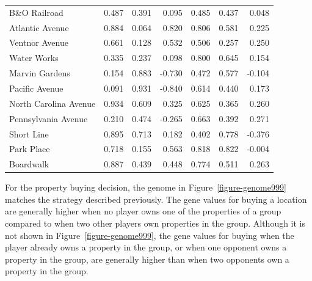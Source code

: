 \begin{table}[htbp]
{\begin{tabular}{lrrr|rrr}
    B\&O Railroad & 0.487  & 0.391  & 0.095  & 0.485  & 0.437  & 0.048 \\
    Atlantic Avenue & 0.884  & 0.064  & 0.820  & 0.806  & 0.581  & 0.225 \\
    Ventnor Avenue & 0.661  & 0.128  & 0.532  & 0.506  & 0.257  & 0.250 \\
    Water Works & 0.335  & 0.237  & 0.098  & 0.800  & 0.645  & 0.154 \\
    Marvin Gardens & 0.154  & 0.883  & -0.730 & 0.472  & 0.577  & -0.104 \\
    \hline 
    Pacific Avenue & 0.091  & 0.931  & -0.840 & 0.614  & 0.440  & 0.173 \\
    North Carolina Avenue & 0.934  & 0.609  & 0.325  & 0.625  & 0.365  & 0.260 \\
    Pennsylvania Avenue & 0.210  & 0.474  & -0.265 & 0.663  & 0.392  & 0.271 \\
    Short Line & 0.895  & 0.713  & 0.182  & 0.402  & 0.778  & -0.376 \\
    Park Place & 0.718  & 0.155  & 0.563  & 0.818  & 0.822  & -0.004 \\
    Boardwalk & 0.887  & 0.439  & 0.448  & 0.774  & 0.511  & 0.263 \\
    \bottomrule
    \end{tabular}}
  \label{tab:chromo_compare}%
\end{table}%

For the property buying decision, the genome in Figure~\ref{figure-genome999}
matches the strategy described previously. The gene values for buying a location
are generally higher when no player owns one of the properties of a group
compared to when two other players own properties in the group. Although it is
not shown in Figure~\ref{figure-genome999}, the gene values for buying when the
player already owns a property in the group, or when one opponent owns a
property in the group, are generally higher than when two opponents own a
property in the group.


